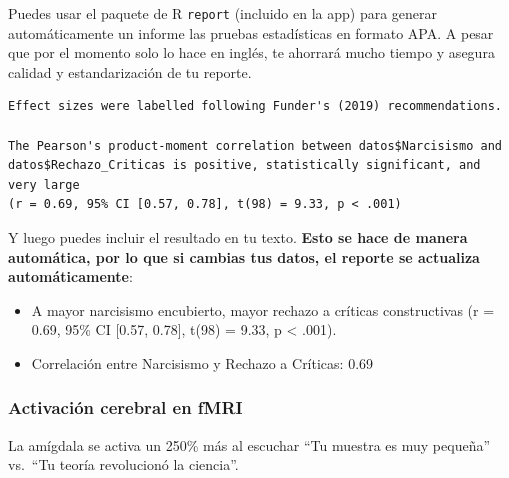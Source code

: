 \documentclass[
  10pt]{article}
\providecommand{\tightlist}{%
  \setlength{\itemsep}{0pt}\setlength{\parskip}{0pt}}\usepackage{longtable,booktabs,array}
\begin{document}
\begin{tcolorbox}[enhanced jigsaw, colframe=quarto-callout-tip-color-frame, colback=white, colbacktitle=quarto-callout-tip-color!10!white, leftrule=.75mm, left=2mm, breakable, coltitle=black, toptitle=1mm, bottomtitle=1mm, rightrule=.15mm, titlerule=0mm, title=\textcolor{quarto-callout-tip-color}{\faLightbulb}\hspace{0.5em}{Tip}, arc=.35mm, bottomrule=.15mm, opacitybacktitle=0.6, opacityback=0, toprule=.15mm]

Puedes usar el paquete de R \texttt{report} (incluido en la app) para
generar automáticamente un informe las pruebas estadísticas en formato
APA. A pesar que por el momento solo lo hace en inglés, te ahorrará
mucho tiempo y asegura calidad y estandarización de tu reporte.

\begin{verbatim}
Effect sizes were labelled following Funder's (2019) recommendations.

The Pearson's product-moment correlation between datos$Narcisismo and
datos$Rechazo_Criticas is positive, statistically significant, and very large
(r = 0.69, 95% CI [0.57, 0.78], t(98) = 9.33, p < .001)
\end{verbatim}

Y luego puedes incluir el resultado en tu texto. \textbf{Esto se hace de
manera automática, por lo que si cambias tus datos, el reporte se
actualiza automáticamente}:

\begin{itemize}
\tightlist
\item
  A mayor narcisismo encubierto, mayor rechazo a críticas constructivas
  (r = 0.69, 95\% CI {[}0.57, 0.78{]}, t(98) = 9.33, p \textless{}
  .001).
\item
  Correlación entre Narcisismo y Rechazo a Críticas: 0.69
\end{itemize}

\end{tcolorbox}

\subsubsection{Activación cerebral en
fMRI}\label{activaciuxf3n-cerebral-en-fmri}

La amígdala se activa un 250\% más al escuchar ``Tu muestra es muy
pequeña'' vs.~``Tu teoría revolucionó la ciencia''.
\end{document}
